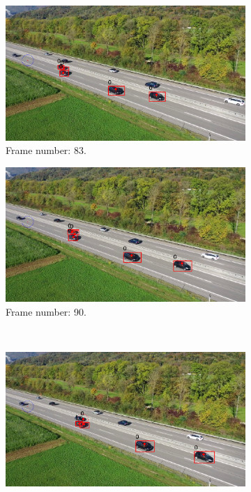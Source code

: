 \begin{figure}[H]
    \centering
    \begin{subfigure}{0.48\textwidth}
        \centering
        \includegraphics[width=\linewidth]{../../../experiments/E1/V2/noPd/83}
        \caption{Frame number: 83.}
        \label{fig:E1-V2-S0:01}
    \end{subfigure}
    \begin{subfigure}{0.48\textwidth}
        \centering
        \includegraphics[width=\linewidth]{../../../experiments/E1/V2/noPd/90}
        \caption{Frame number: 90.}
        \label{fig:E1-V2-S0:02}
    \end{subfigure}
    \\
    \begin{subfigure}{0.48\textwidth}
        \centering
        \includegraphics[width=\linewidth]{../../../experiments/E1/V2/noPd/95}

\end{subfigure}
\end{figure}
